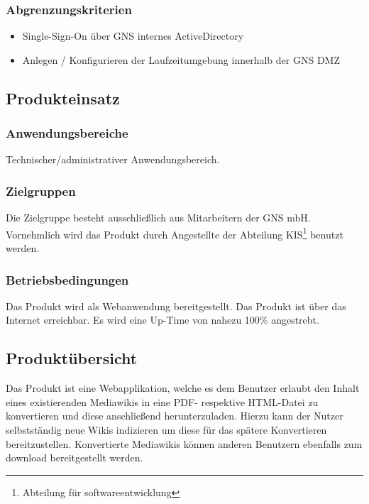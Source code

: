 	\subsubsection*{Abgrenzungskriterien}
		\begin{itemize}
			\item Single-Sign-On über GNS internes ActiveDirectory
			\item Anlegen / Konfigurieren der Laufzeitumgebung innerhalb der GNS DMZ
		\end{itemize}

\subsection*{Produkteinsatz}

	\subsubsection*{Anwendungsbereiche}
		Technischer/administrativer Anwendungsbereich.

	\subsubsection*{Zielgruppen}
		Die Zielgruppe besteht ausschließlich aus Mitarbeitern der GNS mbH.
		Vornehmlich wird das Produkt durch Angestellte der Abteilung
		KIS\footnote{Abteilung für softwareentwicklung} benutzt werden.

	\subsubsection*{Betriebsbedingungen}
		Das Produkt wird als Webanwendung bereitgestellt. Das Produkt ist über das Internet erreichbar.
		Es wird eine Up-Time von nahezu 100\% angestrebt.


\subsection*{Produktübersicht}
	Das Produkt ist eine Webapplikation, welche es dem Benutzer erlaubt den Inhalt eines existierenden
	Mediawikis in eine PDF- respektive HTML-Datei zu konvertieren und diese anschließend herunterzuladen.
	Hierzu kann der Nutzer selbstständig neue Wikis indizieren um diese für das spätere Konvertieren
	bereitzustellen. Konvertierte Mediawikis können anderen Benutzern ebenfalls zum download bereitgestellt
	werden.

